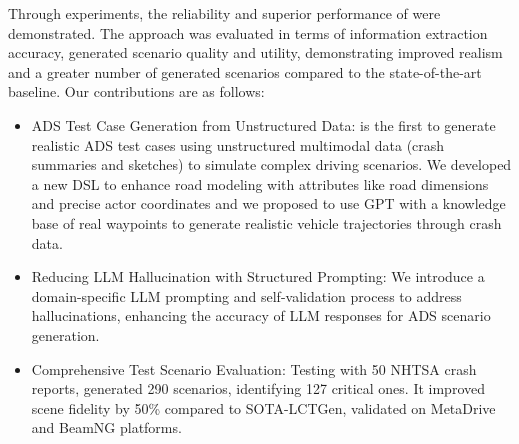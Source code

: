 Through experiments, the reliability and superior performance of {\tool} were demonstrated. The approach was evaluated in terms of information extraction accuracy, generated scenario quality and utility, demonstrating improved realism and a greater number of generated scenarios compared to the state-of-the-art baseline. Our contributions are as follows:\vspace{-4mm}
\begin{itemize}
    \setlength{\itemsep}{0pt}  %
    \setlength{\parskip}{0pt}  %
\item ADS Test Case Generation from Unstructured Data: {\tool} is the first to generate realistic ADS test cases using unstructured multimodal data (crash summaries and sketches) to simulate complex driving scenarios. We developed a new DSL to enhance road modeling with attributes like road dimensions and precise actor coordinates and we proposed to use GPT with a knowledge base of real waypoints to generate realistic vehicle trajectories through crash data.

\item Reducing LLM Hallucination with Structured Prompting: We introduce a domain-specific LLM prompting and self-validation process to address hallucinations, enhancing the accuracy of LLM responses for ADS scenario generation.



\item Comprehensive Test Scenario Evaluation: Testing with 50 NHTSA crash reports, {\tool} generated 290 scenarios, identifying 127 critical ones. It improved scene fidelity by 50\% compared to SOTA-LCTGen, validated on MetaDrive and BeamNG platforms.


\end{itemize}
